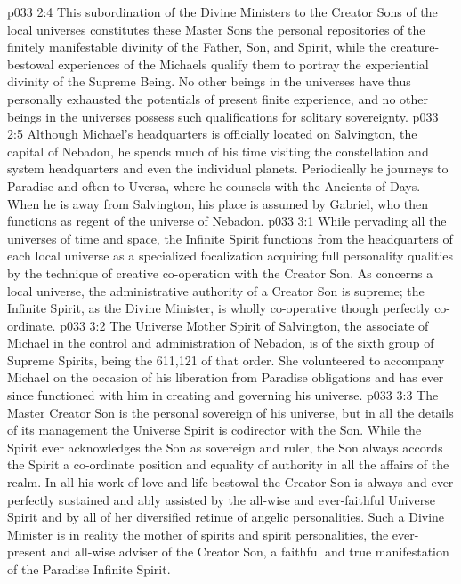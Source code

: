 \vs p033 2:4 This subordination of the Divine Ministers to the Creator Sons of the local universes constitutes these Master Sons the personal repositories of the finitely manifestable divinity of the Father, Son, and Spirit, while the creature\hyp{}bestowal experiences of the Michaels qualify them to portray the experiential divinity of the Supreme Being. No other beings in the universes have thus personally exhausted the potentials of present finite experience, and no other beings in the universes possess such qualifications for solitary sovereignty.
\vs p033 2:5 \pc Although Michael’s headquarters is officially located on Salvington, the capital of Nebadon, he spends much of his time visiting the constellation and system headquarters and even the individual planets. Periodically he journeys to Paradise and often to Uversa, where he counsels with the Ancients of Days. When he is away from Salvington, his place is assumed by Gabriel, who then functions as regent of the universe of Nebadon.
\vs p033 3:1 While pervading all the universes of time and space, the Infinite Spirit functions from the headquarters of each local universe as a specialized focalization acquiring full personality qualities by the technique of creative co\hyp{}operation with the Creator Son. As concerns a local universe, the administrative authority of a Creator Son is supreme; the Infinite Spirit, as the Divine Minister, is wholly co\hyp{}operative though perfectly co\hyp{}ordinate.
\vs p033 3:2 \pc The Universe Mother Spirit of Salvington, the associate of Michael in the control and administration of Nebadon, is of the sixth group of Supreme Spirits, being the 611,121 of that order. She volunteered to accompany Michael on the occasion of his liberation from Paradise obligations and has ever since functioned with him in creating and governing his universe.
\vs p033 3:3 \pc The Master Creator Son is the personal sovereign of his universe, but in all the details of its management the Universe Spirit is codirector with the Son. While the Spirit ever acknowledges the Son as sovereign and ruler, the Son always accords the Spirit a co\hyp{}ordinate position and equality of authority in all the affairs of the realm. In all his work of love and life bestowal the Creator Son is always and ever perfectly sustained and ably assisted by the all\hyp{}wise and ever\hyp{}faithful Universe Spirit and by all of her diversified retinue of angelic personalities. Such a Divine Minister is in reality the mother of spirits and spirit personalities, the ever\hyp{}present and all\hyp{}wise adviser of the Creator Son, a faithful and true manifestation of the Paradise Infinite Spirit.
